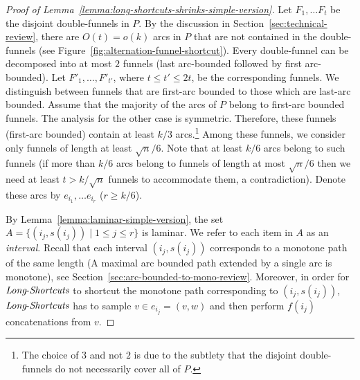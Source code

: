 \documentclass[11pt]{article}
\newcommand{\LS}{\mbox{{\it Long}-{\it Shortcuts}}}
\begin{document}
\begin{proof}[Proof of Lemma~\ref{lemma:long-shortcuts-shrinks-simple-version}]
     Let $F_1,\ldots F_t$ be the disjoint double-funnels in $P$. By the discussion in Section~\ref{sec:technical-review}, there are $O(t)=o(k)$ arcs in $P$ that are not contained in the double-funnels (see Figure~\ref{fig:alternation-funnel-shortcut}). Every double-funnel can be decomposed into at most $2$ funnels (last arc-bounded followed by first arc-bounded). Let $F'_1,\ldots, F'_{t'}$, where $t \le t' \le 2t$, be the corresponding funnels. We distinguish between funnels that are first-arc bounded to those which are last-arc bounded. Assume that the majority of the arcs of $P$ belong to first-arc bounded funnels. The analysis for the other case is symmetric. Therefore, these funnels (first-arc bounded) contain at least $k/3$ arcs.\footnote{The choice of $3$ and not $2$ is due to the subtlety that the disjoint double-funnels do not necessarily cover all of $P$.} Among these funnels, we consider only funnels of length at least $\sqrt{n}/6$. Note that at least $k/6$ arcs belong to such funnels (if more than $k/6$ arcs belong to funnels of length at most $\sqrt{n}/6$ then we need at least $t > k / \sqrt{n} $ funnels to accommodate them, a contradiction). 
     Denote these arcs by $e_{i_1},\ldots e_{i_r}$ ($r \ge k/6$).
    
    By Lemma~\ref{lemma:laminar-simple-version}, the set $A=\{(i_j, s(i_j)) \mid 1\le j \le r \}$ is laminar. We refer to each item in $A$ as an \emph{interval}. Recall that each interval $(i_j,s(i_j))$ corresponds to a monotone path of the same length (A maximal arc bounded path extended by a single arc is monotone), see Section~\ref{sec:arc-bounded-to-mono-review}. 
    Moreover, in order for $\LS$ to shortcut the monotone path corresponding to $(i_j,s(i_j))$, $\LS$  has to sample $v\in e_{i_j}=(v,w)$ and then perform $f(i_j)$ concatenations from $v$.


\end{proof}
\end{document}
